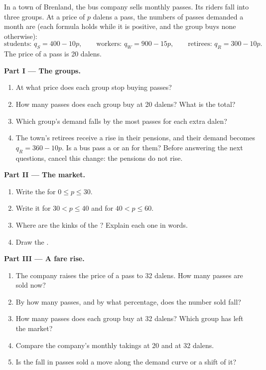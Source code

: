 \begin{problem}
\label{pb:g10:demand:1}
In a town of Brenland, the bus company sells monthly passes. Its riders fall into three groups. At a price of $p$ dalens a
pass, the numbers of passes demanded a month are (each formula holds while it is positive, and the group buys none
otherwise):
\[
  \text{students: } q_S = 400 - 10p, \qquad \text{workers: } q_W = 900 - 15p, \qquad \text{retirees: } q_R = 300 - 10p .
\]
The price of a pass is 20 dalens.

\medskip
\noindent\textbf{Part I --- The groups.}
\begin{enumerate}
\item At what price does each group stop buying passes?
\item How many passes does each group buy at 20 dalens? What is the total?
\item Which group's demand falls by the most passes for each extra dalen?
\item The town's retirees receive a rise in their pensions, and their demand becomes $q_R = 360 - 10p$. Is a bus pass a 
  or an  for them? Before answering the next questions, cancel this change: the pensions do not rise.
\end{enumerate}

\medskip
\noindent\textbf{Part II --- The market.}
\begin{enumerate}[resume]
\item Write the  for $0 \le p \le 30$.
\item Write it for $30 < p \le 40$ and for $40 < p \le 60$.
\item Where are the kinks of the ? Explain each one in words.
\item Draw the .
\end{enumerate}

\medskip
\noindent\textbf{Part III --- A fare rise.}
\begin{enumerate}[resume]
\item The company raises the price of a pass to 32 dalens. How many passes are sold now?
\item By how many passes, and by what percentage, does the number sold fall?
\item How many passes does each group buy at 32 dalens? Which group has left the market?
\item Compare the company's monthly takings at 20 and at 32 dalens.
\item Is the fall in passes sold a move along the demand curve or a shift of it?
\end{enumerate}


\end{problem}
